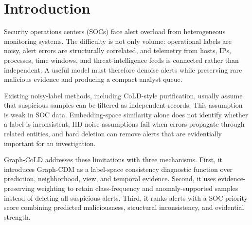 \section{Introduction}
Security operations centers (SOCs) face alert overload from heterogeneous monitoring systems. The difficulty is not only volume: operational labels are noisy, alert errors are structurally correlated, and telemetry from hosts, IPs, processes, time windows, and threat-intelligence feeds is connected rather than independent. A useful model must therefore denoise alerts while preserving rare malicious evidence and producing a compact analyst queue.

Existing noisy-label methods, including CoLD-style purification, usually assume that suspicious samples can be filtered as independent records. This assumption is weak in SOC data. Embedding-space similarity alone does not identify whether a label is inconsistent, IID noise assumptions fail when errors propagate through related entities, and hard deletion can remove alerts that are evidentially important for an investigation.

Graph-CoLD addresses these limitations with three mechanisms. First, it introduces Graph-CDM as a label-space consistency diagnostic function over prediction, neighborhood, view, and temporal evidence. Second, it uses evidence-preserving weighting to retain class-frequency and anomaly-supported samples instead of deleting all suspicious alerts. Third, it ranks alerts with a SOC priority score combining predicted maliciousness, structural inconsistency, and evidential strength.
